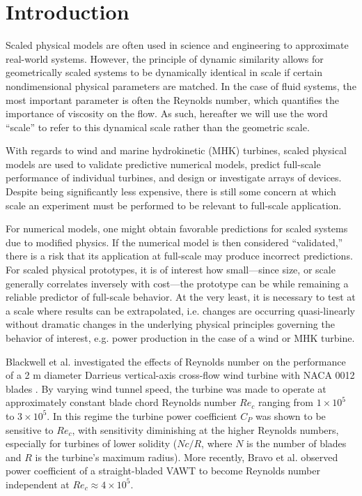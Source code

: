 \documentclass[energies,article,accept,moreauthors,pdftex,12pt,a4paper]{mdpi}
\begin{document}
\listoftodos

\section{Introduction}

Scaled physical models are often used in science and engineering to approximate
real-world systems. However, the principle of dynamic similarity allows for
geometrically scaled systems to be dynamically identical in scale if certain
nondimensional physical parameters are matched. In the case of fluid systems,
the most important parameter is often the Reynolds number, which quantifies the
importance of viscosity on the flow. As such, hereafter we will use the word
``scale'' to refer to this dynamical scale rather than the geometric scale.

With regards to wind and marine hydrokinetic (MHK) turbines, scaled physical
models are used to validate predictive numerical models, predict full-scale
performance of individual turbines, and design or investigate arrays of devices.
Despite being significantly less expensive, there is still some concern at which
scale an experiment must be performed to be relevant to full-scale application.

For numerical models, one might obtain favorable predictions for scaled systems
due to modified physics. If the numerical model is then considered
``validated,'' there is a risk that its application at full-scale may produce
incorrect predictions. For scaled physical prototypes, it is of interest how
small---since size, or scale generally correlates inversely with cost---the
prototype can be while remaining a reliable predictor of full-scale behavior. At
the very least, it is necessary to test at a scale where results can be
extrapolated, i.e. changes are occurring quasi-linearly without dramatic changes
in the underlying physical principles governing the behavior of interest, e.g.
power production in the case of a wind or MHK turbine.

Blackwell et al. investigated the effects of Reynolds number on the performance
of a 2 m diameter Darrieus vertical-axis cross-flow wind turbine with NACA 0012
blades \cite{Blackwell1976}. By varying wind tunnel speed, the turbine was made
to operate at approximately constant blade chord Reynolds number $Re_c$ ranging
from $1 \times 10^5$ to $3 \times 10^5$. In this regime the turbine power
coefficient $C_P$ was shown to be sensitive to $Re_c$, with sensitivity
diminishing at the higher Reynolds numbers, especially for turbines of lower
solidity ($Nc/R$, where $N$ is the number of blades and $R$ is the turbine's
maximum radius). More recently, Bravo et al. observed power coefficient of a
straight-bladed VAWT to become Reynolds number independent at $Re_c \approx 4
\times 10^5$.
\end{document}

